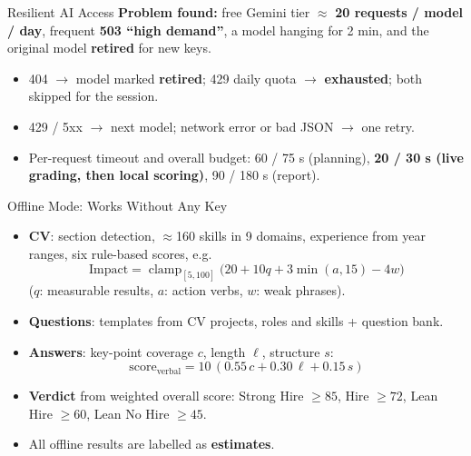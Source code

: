 \documentclass[aspectratio=169,11pt,xcolor=table]{beamer}
\begin{document}
\begin{frame}{Resilient AI Access}
  \small
  \textbf{Problem found:} free Gemini tier $\approx$ \textbf{20 requests / model / day}, frequent \textbf{503 ``high demand''}, a model hanging for 2 min, and the original model \textbf{retired} for new keys.
  \vspace{0.3cm}

  \centering
  \vspace{0.3cm}

  \raggedright
  \begin{itemize}
    \item 404 $\to$ model marked \textbf{retired}; 429 daily quota $\to$ \textbf{exhausted}; both skipped for the session.
    \item 429 / 5xx $\to$ next model; network error or bad JSON $\to$ one retry.
    \item Per-request timeout and overall budget: 60 / 75 s (planning), \textbf{20 / 30 s (live grading, then local scoring)}, 90 / 180 s (report).
  \end{itemize}
\end{frame}

\begin{frame}{Offline Mode: Works Without Any Key}
  \small
  \begin{itemize}
    \item \textbf{CV}: section detection, $\approx$160 skills in 9 domains, experience from year ranges, six rule-based scores, e.g.
      \[ \text{Impact} = \operatorname{clamp}_{[5,100]}\bigl(20 + 10q + 3\min(a,15) - 4w\bigr) \]
      ($q$: measurable results, $a$: action verbs, $w$: weak phrases).
    \item \textbf{Questions}: templates from CV projects, roles and skills + question bank.
    \item \textbf{Answers}: key-point coverage $c$, length $\ell$, structure $s$:
      \[ \text{score}_{\text{verbal}} = 10\,(0.55\,c + 0.30\,\ell + 0.15\,s) \]
    \item \textbf{Verdict} from weighted overall score: Strong Hire $\ge 85$, Hire $\ge 72$, Lean Hire $\ge 60$, Lean No Hire $\ge 45$.
    \item All offline results are labelled as \textbf{estimates}.
  \end{itemize}
\end{frame}
\end{document}
